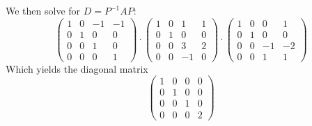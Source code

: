 \documentclass[12pt, a4paper]{article}
\begin{document}
We then solve for $D = P^{-1}AP$:
\[
    \begin{pmatrix}
        1 & 0 &-1 &-1 \\
        0 & 1 & 0 & 0 \\
        0 & 0 & 1 & 0 \\
        0 & 0 & 0 & 1
    \end{pmatrix} \cdot
    \begin{pmatrix}
        1 & 0 & 1 & 1\\
        0 & 1 & 0 & 0\\
        0 & 0 & 3 & 2\\
        0 & 0 &-1 & 0
    \end{pmatrix} \cdot
    \begin{pmatrix}
        1 & 0 & 0 & 1 \\
        0 & 1 & 0 & 0 \\
        0 & 0 &-1 &-2 \\
        0 & 0 & 1 & 1
    \end{pmatrix}
\]
Which yields the diagonal matrix
\[
    \begin{pmatrix}
        1 & 0 & 0 & 0 \\
        0 & 1 & 0 & 0 \\
        0 & 0 & 1 & 0 \\
        0 & 0 & 0 & 2
    \end{pmatrix}
\]
\end{document}
